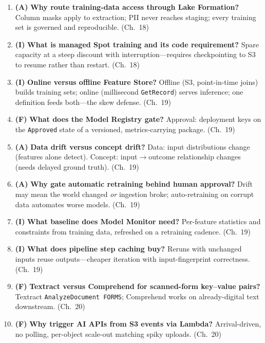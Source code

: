 \begin{enumerate}
    Explores preprocessors, algorithms, hyperparameters; evaluates on validation splits against
    the objective; ranks a winner with inspectable candidate notebooks. (Ch.~18)
    \item \textbf{(A)} \textbf{Why route training-data access through Lake Formation?}
    Column masks apply to extraction; PII never reaches staging; every training set is governed
    and reproducible. (Ch.~18)
    \item \textbf{(I)} \textbf{What is managed Spot training and its code requirement?}
    Spare capacity at a steep discount with interruption---requires checkpointing to S3 to resume
    rather than restart. (Ch.~18)
    \item \textbf{(I)} \textbf{Online versus offline Feature Store?}
    Offline (S3, point-in-time joins) builds training sets; online (millisecond
    \texttt{GetRecord}) serves inference; one definition feeds both---the skew defense. (Ch.~19)
    \item \textbf{(F)} \textbf{What does the Model Registry gate?}
    Approval: deployment keys on the \texttt{Approved} state of a versioned, metrics-carrying
    package. (Ch.~19)
    \item \textbf{(A)} \textbf{Data drift versus concept drift?}
    Data: input distributions change (features alone detect). Concept: input$\rightarrow$outcome
    relationship changes (needs delayed ground truth). (Ch.~19)
    \item \textbf{(A)} \textbf{Why gate automatic retraining behind human approval?}
    Drift may mean the world changed \emph{or} ingestion broke; auto-retraining on corrupt data
    automates worse models. (Ch.~19)
    \item \textbf{(I)} \textbf{What baseline does Model Monitor need?}
    Per-feature statistics and constraints from training data, refreshed on a retraining cadence.
    (Ch.~19)
    \item \textbf{(I)} \textbf{What does pipeline step caching buy?}
    Reruns with unchanged inputs reuse outputs---cheaper iteration with input-fingerprint
    correctness. (Ch.~19)
    \item \textbf{(F)} \textbf{Textract versus Comprehend for scanned-form key--value pairs?}
    Textract \texttt{AnalyzeDocument FORMS}; Comprehend works on already-digital text downstream.
    (Ch.~20)
    \item \textbf{(F)} \textbf{Why trigger AI APIs from S3 events via Lambda?}
    Arrival-driven, no polling, per-object scale-out matching spiky uploads. (Ch.~20)

\end{enumerate}
